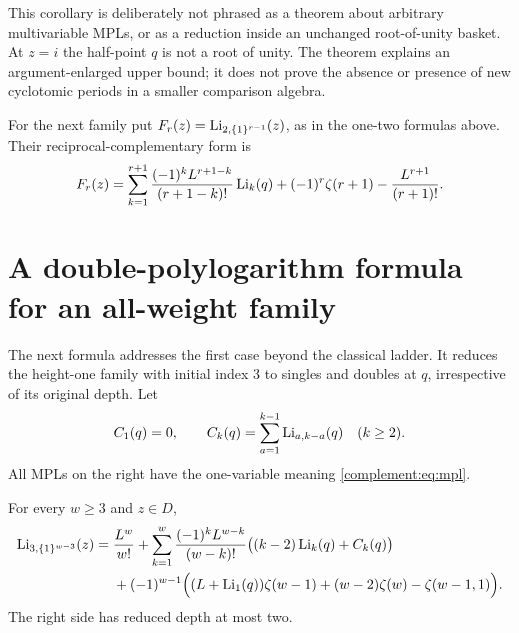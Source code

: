 This corollary is deliberately not phrased as a theorem about arbitrary
multivariable MPLs, or as a reduction inside an unchanged root-of-unity
basket. At $z=i$ the half-point $q$ is not a root of unity. The theorem
explains an argument-enlarged upper bound; it does not prove the absence
or presence of new cyclotomic periods in a smaller comparison algebra.


For the next family put $F_r(z)=\operatorname{Li}_{2,\{1\}^{r-1}}(z)$, as in the
one-two formulas above. Their reciprocal-complementary form is
\[
 F_r(z)=\sum_{k=1}^{r+1}\frac{(-1)^kL^{r+1-k}}{(r+1-k)!}\operatorname{Li}_k(q)
 +(-1)^r\zeta(r+1)-\frac{L^{r+1}}{(r+1)!}.
\]
\section{A double-polylogarithm formula for an all-weight family}

The next formula addresses the first case beyond the classical ladder.
It reduces the height-one family with initial index $3$ to singles and
doubles at $q$, irrespective of its original depth.
Let
\begin{equation}\label{complement:eq:Ck}
 C_1(q)=0,\qquad C_k(q)=\sum_{a=1}^{k-1}\operatorname{Li}_{a,k-a}(q)\quad(k\ge2).
\end{equation}
All MPLs on the right have the one-variable meaning \eqref{complement:eq:mpl}.

\begin{theorem}\label{complement:thm:twozero}
For every $w\ge3$ and $z\in D$,
\begin{align}
\operatorname{Li}_{3,\{1\}^{w-3}}(z)
={}&\frac{L^w}{w!}
 +\sum_{k=1}^{w}\frac{(-1)^kL^{w-k}}{(w-k)!}
   \bigl((k-2)\operatorname{Li}_k(q)+C_k(q)\bigr)\notag\\
&+(-1)^{w-1}\Bigl((L+\operatorname{Li}_1(q))\zeta(w-1)
 +(w-2)\zeta(w)-\zeta(w-1,1)\Bigr).
\label{complement:eq:twozero}
\end{align}
The right side has reduced depth at most two.
\end{theorem}

